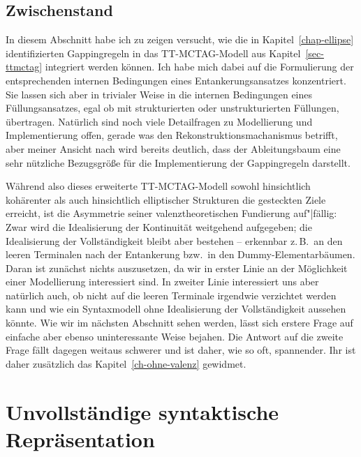 \subsection{Zwischenstand}

In diesem Abschnitt habe ich zu zeigen versucht, wie die in Kapitel~\ref{chap-ellipse} identifizierten Gappingregeln in das TT-MCTAG-Modell aus Kapitel~\ref{sec-ttmctag} integriert werden können. Ich habe mich dabei auf die Formulierung der entsprechenden internen Bedingungen eines Entankerungsansatzes konzentriert. Sie lassen sich aber in trivialer Weise in die internen Bedingungen eines Füllungsansatzes, egal ob mit strukturierten oder unstrukturierten Füllungen, übertragen. Natürlich sind noch viele Detailfragen zu Modellierung und Implementierung offen, gerade was den Rekonstruktionsmachanismus betrifft, aber meiner Ansicht nach wird bereits deutlich, dass der Ableitungsbaum eine sehr nützliche Bezugsgrö\ss e für die Implementierung der Gappingregeln darstellt. 

Während also dieses erweiterte TT-MCTAG-Modell sowohl hinsichtlich kohärenter als auch hinsichtlich elliptischer Strukturen die gesteckten Ziele erreicht, ist die Asymmetrie seiner valenztheoretischen Fundierung auf"|fällig: Zwar wird die Idealisierung der Kontinuität weitgehend aufgegeben; die Idealisierung der Vollständigkeit bleibt aber bestehen -- erkennbar z.\,B.\ an den leeren Terminalen nach der Entankerung bzw.\ in den Dummy-Elementarbäumen. Daran ist zunächst nichts auszusetzen, da wir in erster Linie an der Möglichkeit einer Modellierung interessiert sind. In zweiter Linie interessiert uns aber natürlich auch, ob nicht auf die leeren Terminale irgendwie verzichtet werden kann und wie ein Syntaxmodell ohne Idealisierung der Vollständigkeit aussehen könnte. Wie wir im nächsten Abschnitt sehen werden, lässt sich erstere Frage auf einfache aber ebenso uninteressante Weise bejahen. Die Antwort auf die zweite Frage fällt dagegen weitaus schwerer und ist daher, wie so oft, spannender. Ihr ist daher zusätzlich das Kapitel~\ref{ch-ohne-valenz} gewidmet. 


\section{Unvollständige syntaktische Repräsentation}\label{sec-unvollständige-repräsentation}

